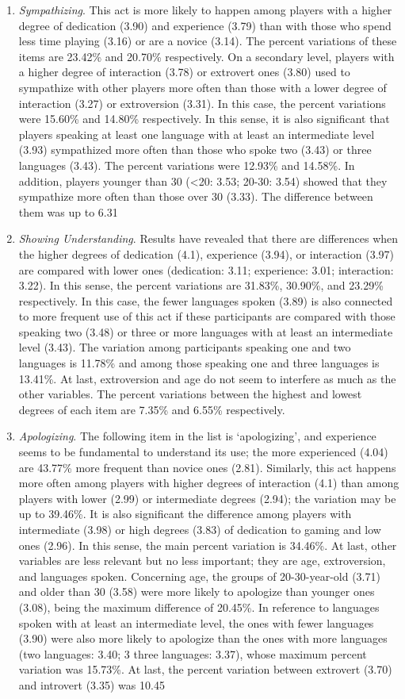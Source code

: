\documentclass[english]{textolivre}
\begin{document}
\begin{enumerate}
\item \emph{Sympathizing}. This act is more likely to happen among players with a higher degree of dedication (3.90) and experience (3.79) than with those who spend less time playing (3.16) or are a novice (3.14). The percent variations of these items are 23.42\% and 20.70\% respectively. On a secondary level, players with a higher degree of interaction (3.78) or extrovert ones (3.80) used to sympathize with other players more often than those with a lower degree of interaction (3.27) or extroversion (3.31). In this case, the percent variations were 15.60\% and 14.80\% respectively. In this sense, it is also significant that players speaking at least one language with at least an intermediate level (3.93) sympathized more often than those who spoke two (3.43) or three languages (3.43). The percent variations were 12.93\% and 14.58\%. In addition, players younger than 30 (<20: 3.53; 20-30: 3.54) showed that they sympathize more often than those over 30 (3.33). The difference between them was up to 6.31%
\item \emph{Showing Understanding}. Results have revealed that there are differences when the higher degrees of dedication (4.1), experience (3.94), or interaction (3.97) are compared with lower ones (dedication: 3.11; experience: 3.01; interaction: 3.22). In this sense, the percent variations are 31.83\%, 30.90\%, and 23.29\% respectively. In this case, the fewer languages spoken (3.89) is also connected to more frequent use of this act if these participants are compared with those speaking two (3.48) or three or more languages with at least an intermediate level (3.43). The variation among participants speaking one and two languages is 11.78\% and among those speaking one and three languages is 13.41\%. At last, extroversion and age do not seem to interfere as much as the other variables. The percent variations between the highest and lowest degrees of each item are 7.35\% and 6.55\% respectively. 
\item \emph{Apologizing}. The following item in the list is ‘apologizing’, and experience seems to be fundamental to understand its use; the more experienced (4.04) are 43.77\% more frequent than novice ones (2.81). Similarly, this act happens more often among players with higher degrees of interaction (4.1) than among players with lower (2.99) or intermediate degrees (2.94); the variation may be up to 39.46\%. It is also significant the difference among players with intermediate (3.98) or high degrees (3.83) of dedication to gaming and low ones (2.96). In this sense, the main percent variation is 34.46\%. At last, other variables are less relevant but no less important; they are age, extroversion, and languages spoken. Concerning age, the groups of 20-30-year-old (3.71) and older than 30 (3.58) were more likely to apologize than younger ones (3.08), being the maximum difference of 20.45\%. In reference to languages spoken with at least an intermediate level, the ones with fewer languages (3.90) were also more likely to apologize than the ones with more languages (two languages: 3.40; 3 three languages: 3.37), whose maximum percent variation was 15.73\%. At last, the percent variation between extrovert (3.70) and introvert (3.35) was 10.45%

\end{enumerate}
\end{document}
